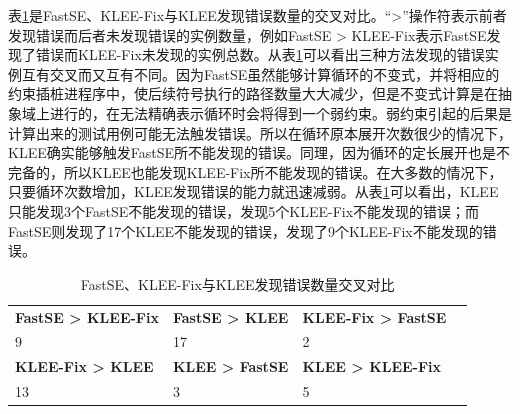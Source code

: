 表\ref{FastSE_KLEE-Fix与KLEE发现错误数量交叉对比}是FastSE、KLEE-Fix与KLEE发现错误数量的交叉对比。“>”操作符表示前者发现错误而后者未发现错误的实例数量，例如FastSE > KLEE-Fix表示FastSE发现了错误而KLEE-Fix未发现的实例总数。从表\ref{FastSE_KLEE-Fix与KLEE发现错误数量交叉对比}可以看出三种方法发现的错误实例互有交叉而又互有不同。因为FastSE虽然能够计算循环的不变式，并将相应的约束插桩进程序中，使后续符号执行的路径数量大大减少，但是不变式计算是在抽象域上进行的，在无法精确表示循环时会将得到一个弱约束。弱约束引起的后果是计算出来的测试用例可能无法触发错误。所以在循环原本展开次数很少的情况下，KLEE确实能够触发FastSE所不能发现的错误。同理，因为循环的定长展开也是不完备的，所以KLEE也能发现KLEE-Fix所不能发现的错误。在大多数的情况下，只要循环次数增加，KLEE发现错误的能力就迅速减弱。从表\ref{FastSE_KLEE-Fix与KLEE发现错误数量交叉对比}可以看出，KLEE只能发现3个FastSE不能发现的错误，发现5个KLEE-Fix不能发现的错误；而FastSE则发现了17个KLEE不能发现的错误，发现了9个KLEE-Fix不能发现的错误。

\begin{table}[ht]
\begin{center}
\caption{FastSE、KLEE-Fix与KLEE发现错误数量交叉对比}
\label{FastSE_KLEE-Fix与KLEE发现错误数量交叉对比}
\begin{small}
\begin{tabular}{|l|l|l|l|}
\hline
{\bf FastSE > KLEE-Fix} & {\bf FastSE > KLEE} & {\bf KLEE-Fix > FastSE} \\
9 & 17 & 2 \\ \hline
{\bf KLEE-Fix > KLEE} & {\bf KLEE > FastSE} & {\bf KLEE > KLEE-Fix} \\
13 & 3 & 5\\
\hline
\end{tabular}
\end{small}
\end{center}
\end{table}


%


